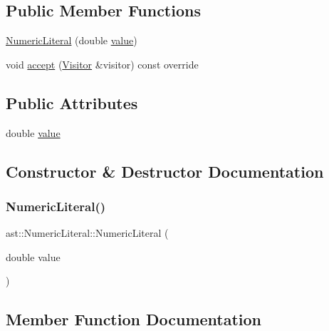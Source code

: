 \subsection*{Public Member Functions}
\begin{DoxyCompactItemize}
\item 
\hyperlink{structast_1_1_numeric_literal_a84f273ad60622f442bc295a7c4b67678}{Numeric\+Literal} (double \hyperlink{structast_1_1_numeric_literal_aae02b7a9318e48b594e8262d9256a423}{value})
\item 
void \hyperlink{structast_1_1_numeric_literal_aa3519aaa740bbb29f178329db48f2bf4}{accept} (\hyperlink{structast_1_1_visitor}{Visitor} \&visitor) const override
\end{DoxyCompactItemize}
\subsection*{Public Attributes}
\begin{DoxyCompactItemize}
\item 
double \hyperlink{structast_1_1_numeric_literal_aae02b7a9318e48b594e8262d9256a423}{value}
\end{DoxyCompactItemize}


\subsection{Constructor \& Destructor Documentation}
\mbox{\label{structast_1_1_numeric_literal_a84f273ad60622f442bc295a7c4b67678}} 
\subsubsection{\texorpdfstring{Numeric\+Literal()}{NumericLiteral()}}
{\footnotesize\ttfamily ast\+::\+Numeric\+Literal\+::\+Numeric\+Literal (\begin{DoxyParamCaption}\item[{double}]{value }\end{DoxyParamCaption})\hspace{0.3cm}{\ttfamily [inline]}}



\subsection{Member Function Documentation}
\mbox{\label{structast_1_1_numeric_literal_aa3519aaa740bbb29f178329db48f2bf4}} 
